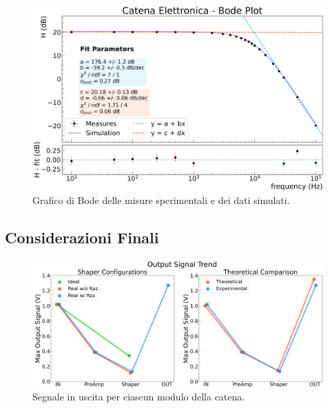 \documentclass[a4paper,11pt]{article} %
\begin{document}
\begin{figure}[H] 
	\centering
	\includegraphics[width=0.8\linewidth]{../Plots/Catena/bode_plot.png} 
	\vspace{-10pt}
	\caption{\small Grafico di Bode delle misure sperimentali e dei dati simulati.} 
	\label{i:catena_thebode} 
\end{figure} 





\subsection{Considerazioni Finali}\label{s:catena_finale}



\begin{figure}[H]
	\centering
	\includegraphics[width=0.9\linewidth]{../Plots/Catena/trend3.png}
	\vspace{-10pt}
	\caption{\small Segnale in uscita per ciascun modulo della catena.}
	\label{i:trend}
\end{figure}
\end{document}
